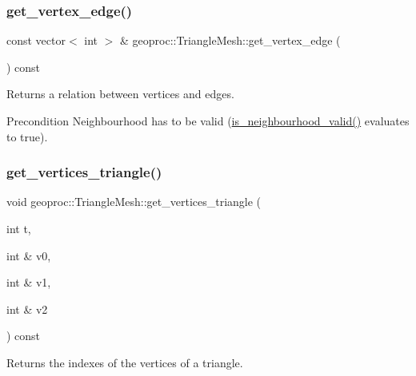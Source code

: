 \subsubsection{\texorpdfstring{get\+\_\+vertex\+\_\+edge()}{get\_vertex\_edge()}}
{\footnotesize\ttfamily const vector$<$ int $>$ \& geoproc\+::\+Triangle\+Mesh\+::get\+\_\+vertex\+\_\+edge (\begin{DoxyParamCaption}{ }\end{DoxyParamCaption}) const}



Returns a relation between vertices and edges. 

\begin{DoxyPrecond}{Precondition}
Neighbourhood has to be valid (\hyperlink{classgeoproc_1_1TriangleMesh_aa6f95b95709a72a14a15638bfeeed3f9}{is\+\_\+neighbourhood\+\_\+valid()} evaluates to true). 
\end{DoxyPrecond}
\mbox{\label{classgeoproc_1_1TriangleMesh_aab448f6f589f4c329b4daca635d9d865}} 
\subsubsection{\texorpdfstring{get\+\_\+vertices\+\_\+triangle()}{get\_vertices\_triangle()}\hspace{0.1cm}{\footnotesize\ttfamily [1/2]}}
{\footnotesize\ttfamily void geoproc\+::\+Triangle\+Mesh\+::get\+\_\+vertices\+\_\+triangle (\begin{DoxyParamCaption}\item[{int}]{t,  }\item[{int \&}]{v0,  }\item[{int \&}]{v1,  }\item[{int \&}]{v2 }\end{DoxyParamCaption}) const}



Returns the indexes of the vertices of a triangle. 

